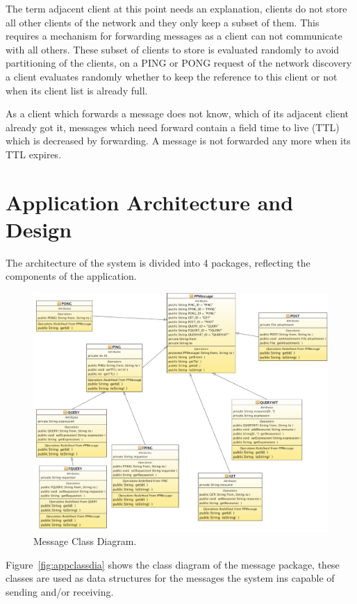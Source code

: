 \documentclass{article}
\begin{document}
The term adjacent client at this point needs an explanation, clients do not
store all other clients of the network and they only keep a subset of them. This
requires a mechanism for forwarding messages as a client can not communicate with
all others. These subset of clients to store is evaluated randomly to avoid
partitioning of the clients, on a PING or PONG request of the network discovery a
client evaluates randomly whether to keep the reference to this client or not
when its client list is already full.

As a client which forwards a message does not know, which of its adjacent
client already got it, messages which need forward contain a field time to
live (TTL) which is decreased by forwarding. A message is not forwarded any
more when its TTL expires.

\section{Application Architecture and Design}

The architecture of the system is divided into 4 packages, reflecting the
components of the application.

\begin{figure}[!hbtp]
\centering
\includegraphics[width=\textwidth]{../img/MessagesClassDiagram.pdf}
\caption{Message Class Diagram.}
\label{fig:messageclassdia}
\end{figure}
Figure~\ref{fig:appclassdia} shows the class diagram of the message package,
these classes are used as data structures for the messages the system ins
capable of sending and/or receiving.
\end{document}
